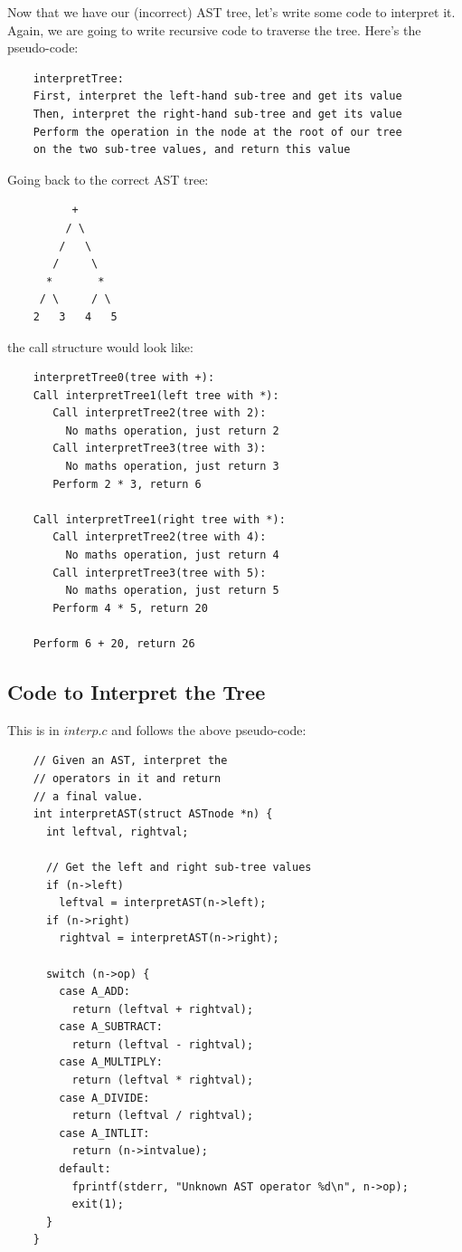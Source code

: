 \documentclass[a4paper,12pt]{article}
\begin{document}
Now that we have our (incorrect) AST tree, let's write some code to interpret it. Again, we are going to write recursive code to traverse the tree. Here's the pseudo-code:

\begin{lstlisting}
    interpretTree:
    First, interpret the left-hand sub-tree and get its value
    Then, interpret the right-hand sub-tree and get its value
    Perform the operation in the node at the root of our tree
    on the two sub-tree values, and return this value
\end{lstlisting}

Going back to the correct AST tree:

\begin{lstlisting}
          +
         / \
        /   \
       /     \
      *       *
     / \     / \
    2   3   4   5
\end{lstlisting}

the call structure would look like:

\begin{lstlisting}
    interpretTree0(tree with +):
    Call interpretTree1(left tree with *):
       Call interpretTree2(tree with 2):
         No maths operation, just return 2
       Call interpretTree3(tree with 3):
         No maths operation, just return 3
       Perform 2 * 3, return 6

    Call interpretTree1(right tree with *):
       Call interpretTree2(tree with 4):
         No maths operation, just return 4
       Call interpretTree3(tree with 5):
         No maths operation, just return 5
       Perform 4 * 5, return 20

    Perform 6 + 20, return 26
\end{lstlisting}

\subsection{Code to Interpret the Tree}

This is in $interp.c$ and follows the above pseudo-code:

\begin{lstlisting}
    // Given an AST, interpret the
    // operators in it and return
    // a final value.
    int interpretAST(struct ASTnode *n) {
      int leftval, rightval;

      // Get the left and right sub-tree values
      if (n->left)
        leftval = interpretAST(n->left);
      if (n->right)
        rightval = interpretAST(n->right);

      switch (n->op) {
        case A_ADD:
          return (leftval + rightval);
        case A_SUBTRACT:
          return (leftval - rightval);
        case A_MULTIPLY:
          return (leftval * rightval);
        case A_DIVIDE:
          return (leftval / rightval);
        case A_INTLIT:
          return (n->intvalue);
        default:
          fprintf(stderr, "Unknown AST operator %d\n", n->op);
          exit(1);
      }
    }
\end{lstlisting}
\end{document}
